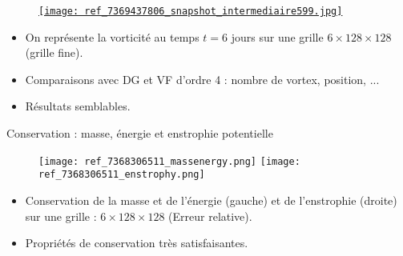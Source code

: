 \documentclass[11pt]{beamer}
\begin{document}

\begin{frame}{}
\begin{figure}
\href{run:./simus/ref_7372378359.avi}{\texttt{[image: ref\_7369437806\_snapshot\_intermediaire599.jpg]}}
\end{figure}
\begin{itemize}
\item On représente la vorticité au temps $t=6$ jours sur une grille $6 \times 128 \times 128$ (grille fine).

\item Comparaisons avec DG et VF d'ordre 4 : nombre de vortex, position, ...

\item Résultats semblables.
\end{itemize}
\end{frame}


\begin{frame}{Conservation : masse, énergie et enstrophie potentielle}
\begin{figure}
\texttt{[image: ref\_7368306511\_massenergy.png]}
\texttt{[image: ref\_7368306511\_enstrophy.png]}
\end{figure}
\begin{itemize}
\item Conservation de la masse et de l'énergie (gauche) et de l'enstrophie (droite) sur une grille : $6 \times 128 \times 128$ (Erreur relative). 

\item Propriétés de conservation très satisfaisantes.
\end{itemize}
\end{frame}
\end{document}
